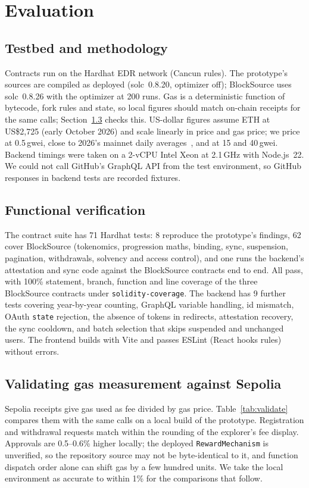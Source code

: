 \documentclass[conference]{IEEEtran}
\begin{document}
\section{Evaluation}\label{sec:eval}

\subsection{Testbed and methodology}
Contracts run on the Hardhat EDR network (Cancun rules). The prototype's sources are compiled as deployed (solc~0.8.20, optimizer off); BlockSource uses solc~0.8.26 with the optimizer at 200 runs. Gas is a deterministic function of bytecode, fork rules and state, so local figures should match on-chain receipts for the same calls; Section~\ref{sec:validate} checks this. US-dollar figures assume ETH at US\$2{,}725 (early October 2026) and scale linearly in price and gas price; we price at 0.5\,gwei, close to 2026's mainnet daily averages~\cite{ethorg2026}, and at 15 and 40\,gwei. Backend timings were taken on a 2-vCPU Intel Xeon at 2.1\,GHz with Node.js~22. We could not call GitHub's GraphQL API from the test environment, so GitHub responses in backend tests are recorded fixtures.

\subsection{Functional verification}
The contract suite has 71 Hardhat tests: 8 reproduce the prototype's findings, 62 cover BlockSource (tokenomics, progression maths, binding, sync, suspension, pagination, withdrawals, solvency and access control), and one runs the backend's attestation and sync code against the BlockSource contracts end to end. All pass, with 100\% statement, branch, function and line coverage of the three BlockSource contracts under \texttt{solidity-coverage}. The backend has 9 further tests covering year-by-year counting, GraphQL variable handling, id mismatch, OAuth \texttt{state} rejection, the absence of tokens in redirects, attestation recovery, the sync cooldown, and batch selection that skips suspended and unchanged users. The frontend builds with Vite and passes ESLint (React hooks rules) without errors.

\subsection{Validating gas measurement against Sepolia}\label{sec:validate}
Sepolia receipts give gas used as fee divided by gas price. Table~\ref{tab:validate} compares them with the same calls on a local build of the prototype. Registration and withdrawal requests match within the rounding of the explorer's fee display. Approvals are 0.5--0.6\% higher locally; the deployed \texttt{RewardMechanism} is unverified, so the repository source may not be byte-identical to it, and function dispatch order alone can shift gas by a few hundred units. We take the local environment as accurate to within 1\% for the comparisons that follow.
\end{document}
